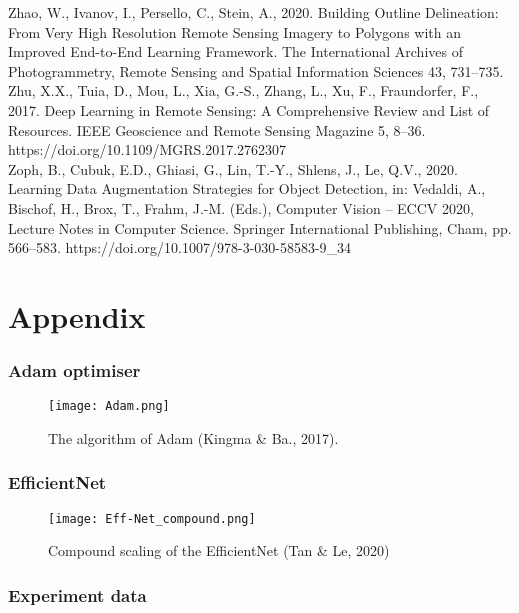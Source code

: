 \documentclass[11pt, a4paper, twoside]{report}
\begin{document}
Zhao, W., Ivanov, I., Persello, C., Stein, A., 2020. Building Outline Delineation: From Very High Resolution Remote Sensing Imagery to Polygons with an Improved End-to-End Learning Framework. The International Archives of Photogrammetry, Remote Sensing and Spatial Information Sciences 43, 731–735.\\
Zhu, X.X., Tuia, D., Mou, L., Xia, G.-S., Zhang, L., Xu, F., Fraundorfer, F., 2017. Deep Learning in Remote Sensing: A Comprehensive Review and List of Resources. IEEE Geoscience and Remote Sensing Magazine 5, 8–36. https://doi.org/10.1109/MGRS.2017.2762307\\
Zoph, B., Cubuk, E.D., Ghiasi, G., Lin, T.-Y., Shlens, J., Le, Q.V., 2020. Learning Data Augmentation Strategies for Object Detection, in: Vedaldi, A., Bischof, H., Brox, T., Frahm, J.-M. (Eds.), Computer Vision – ECCV 2020, Lecture Notes in Computer Science. Springer International Publishing, Cham, pp. 566–583. https://doi.org/10.1007/978-3-030-58583-9\_34\\

\newpage

\chapter{Appendix}\label{Appen}

\subsection{Adam optimiser}\label{Adam}

\begin{figure}[H]
  \centering
  \texttt{[image: Adam.png]}
  \caption{The algorithm of Adam (Kingma \& Ba., 2017).}
  \label{app:Adam}
\end{figure}

\subsection{EfficientNet}\label{Eff-Net}

\begin{figure}[H]
  \centering
  \texttt{[image: Eff-Net\_compound.png]}
  \caption{Compound scaling of the EfficientNet (Tan \& Le, 2020)}
  \label{app:EfficientNet}
\end{figure}

\newpage

\subsection{Experiment data}\label{fulldata}
\end{document}
